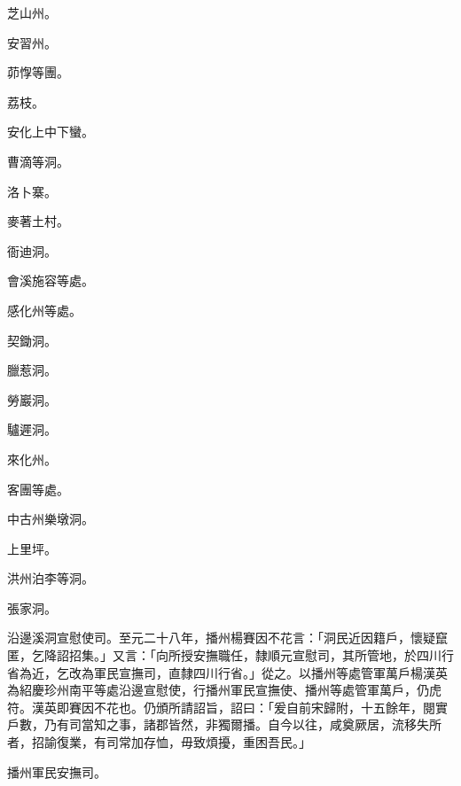 \begin{pinyinscope}
 芝山州。



 安習州。



 茆惸等團。



 荔枝。



 安化上中下蠻。



 曹滴等洞。



 洛卜寨。



 麥著土村。



 衙迪洞。



 會溪施容等處。



 感化州等處。



 契鋤洞。



 臘惹洞。



 勞巖洞。



 驢遲洞。



 來化州。



 客團等處。



 中古州樂墩洞。



 上里坪。



 洪州泊李等洞。



 張家洞。



 沿邊溪洞宣慰使司。至元二十八年，播州楊賽因不花言：「洞民近因籍戶，懷疑竄匿，乞降詔招集。」又言：「向所授安撫職任，隸順元宣慰司，其所管地，於四川行省為近，乞改為軍民宣撫司，直隸四川行省。」從之。以播州等處管軍萬戶楊漢英為紹慶珍州南平等處沿邊宣慰使，行播州軍民宣撫使、播州等處管軍萬戶，仍虎符。漢英即賽因不花也。仍頒所請詔旨，詔曰：「爰自前宋歸附，十五餘年，閱實戶數，乃有司當知之事，諸郡皆然，非獨爾播。自今以往，咸奠厥居，流移失所者，招諭復業，有司常加存恤，毋致煩擾，重困吾民。」



 播州軍民安撫司。




\end{pinyinscope}
